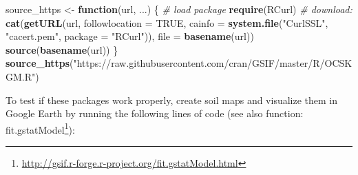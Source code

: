 \documentclass[graybox,natbib,nospthms,UStrade]{svmono}
\newenvironment{Shaded}{\begin{snugshade}}{\end{snugshade}}
\newcommand{\CommentTok}[1]{\textcolor[rgb]{0.37,0.37,0.37}{\textit{#1}}}
\newcommand{\ControlFlowTok}[1]{\textcolor[rgb]{0.27,0.27,0.27}{\textbf{#1}}}
\newcommand{\DataTypeTok}[1]{\textcolor[rgb]{0.27,0.27,0.27}{#1}}
\newcommand{\KeywordTok}[1]{\textcolor[rgb]{0.27,0.27,0.27}{\textbf{#1}}}
\newcommand{\NormalTok}[1]{#1}
\newcommand{\OtherTok}[1]{\textcolor[rgb]{0.37,0.37,0.37}{#1}}
\newcommand{\StringTok}[1]{\textcolor[rgb]{0.5,0.5,0.5}{#1}}
\renewcommand{\href}[2]{#2 (\url{#1})}
\renewcommand{\href}[2]{#2\footnote{\url{#1}}}
\begin{document}
\begin{Shaded}
\begin{Highlighting}[]
\NormalTok{source_https <-}\StringTok{ }\ControlFlowTok{function}\NormalTok{(url, ...) \{}
   \CommentTok{# load package}
   \KeywordTok{require}\NormalTok{(RCurl)}
   \CommentTok{# download:}
   \KeywordTok{cat}\NormalTok{(}\KeywordTok{getURL}\NormalTok{(url, }\DataTypeTok{followlocation =} \OtherTok{TRUE}\NormalTok{, }
       \DataTypeTok{cainfo =} \KeywordTok{system.file}\NormalTok{(}\StringTok{"CurlSSL"}\NormalTok{, }\StringTok{"cacert.pem"}\NormalTok{, }\DataTypeTok{package =} \StringTok{"RCurl"}\NormalTok{)), }
       \DataTypeTok{file =} \KeywordTok{basename}\NormalTok{(url))}
   \KeywordTok{source}\NormalTok{(}\KeywordTok{basename}\NormalTok{(url))}
\NormalTok{\}}
\KeywordTok{source_https}\NormalTok{(}\StringTok{"https://raw.githubusercontent.com/cran/GSIF/master/R/OCSKGM.R"}\NormalTok{)}
\end{Highlighting}
\end{Shaded}

To test if these packages work properly, create soil maps and visualize them in Google Earth by running the following lines of code (see also function: \href{http://gsif.r-forge.r-project.org/fit.gstatModel.html}{fit.gstatModel}):
\end{document}
